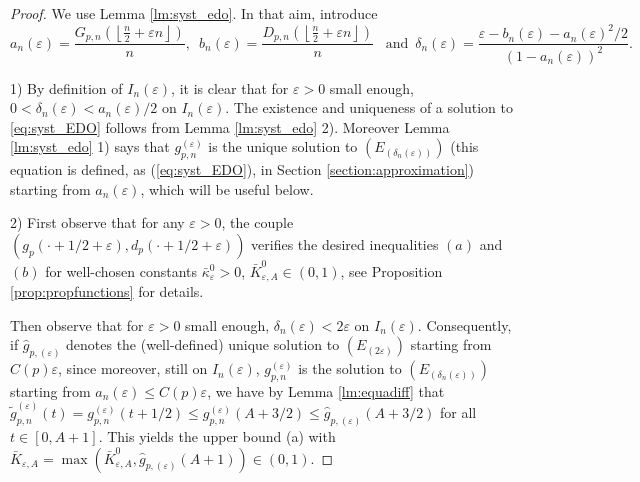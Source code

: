 \documentclass[a4, 11pt]{article}
\numberwithin{equation}{section}
\theoremstyle{plain}
\theoremstyle{definition}
\theoremstyle{remark}
\begin{document}
\begin{proof} We use Lemma \ref{lm:syst_edo}. In that aim, introduce
	$$a_n(\varepsilon)=\frac{G_{p,n}\left(\left\lfloor\frac{n}{2}+\varepsilon n\right\rfloor\right)}{n}, \,\,\, b_n(\varepsilon)=\frac{D_{p,n}\left(\left\lfloor\frac{n}{2}+\varepsilon n\right\rfloor\right)}{n} \,\,\, \text{ and }\,  \delta_{n}(\varepsilon)=\frac{\varepsilon-b_n(\varepsilon)-a_n(\varepsilon)^2/2}{\left(1-a_n(\varepsilon)\right)^2}.$$ 
	
1) By definition of $I_n(\varepsilon)$, it is clear that for $\varepsilon>0$ small enough, $0<\delta_{n}(\varepsilon)<a_n(\varepsilon)/2$ on $I_n(\varepsilon).$ The existence and uniqueness of a solution to \eqref{eq:syst_EDO} follows from Lemma \ref{lm:syst_edo} 2). Moreover Lemma \ref{lm:syst_edo} 1) says that $g_{p,n}^{(\varepsilon)}$ is the unique solution to $(E_{(\delta_n(\varepsilon))})$ (this equation is defined, as  (\ref{eq:syst_EDO}), in Section \ref{section:approximation}) starting from $a_n(\varepsilon)$, which will be useful below.

2) First observe that for any $\varepsilon>0$, the couple $(g_p(\cdot+1/2+\varepsilon),d_p(\cdot+1/2+\varepsilon))$ verifies the desired inequalities $(a)$ and $(b)$ for well-chosen constants $\bar \kappa^{0}_{\varepsilon}>0$, $\bar K^{0}_{\varepsilon,A} \in (0,1)$, see Proposition \ref{prop:propfunctions} for details. 

Then observe that for $\varepsilon>0$ small enough, $\delta_n(\varepsilon)< 2\varepsilon$ on $I_n(\varepsilon)$. Consequently, if $\hat{g}_{p,(\varepsilon)}$ denotes the (well-defined) unique solution to $(E_{(2\varepsilon)})$ starting from $C(p)\varepsilon$, since moreover, still on $I_n(\varepsilon)$, ${g}_{p,n}^{(\varepsilon)}$ is the solution to $(E_{(\delta_n(\varepsilon))})$ starting from $a_n(\varepsilon)\leq C(p)\varepsilon$, we have by Lemma \ref{lm:equadiff} that $\tilde{g}_{p,n}^{(\varepsilon)}(t)=g_{p,n}^{(\varepsilon)}(t+1/2)\leq g_{p,n}^{(\varepsilon)}(A+3/2) \leq \hat{g}_{p,(\varepsilon)}(A+3/2)$ for all $t\in \left[0,A+1\right]$.
This yields the upper bound (a) with $\bar K_{\varepsilon,A}=\max(\bar K^{0}_{\varepsilon,A},\hat{g}_{p,(\varepsilon)}(A+1)) \in (0,1)$.


\end{proof}
\end{document}
